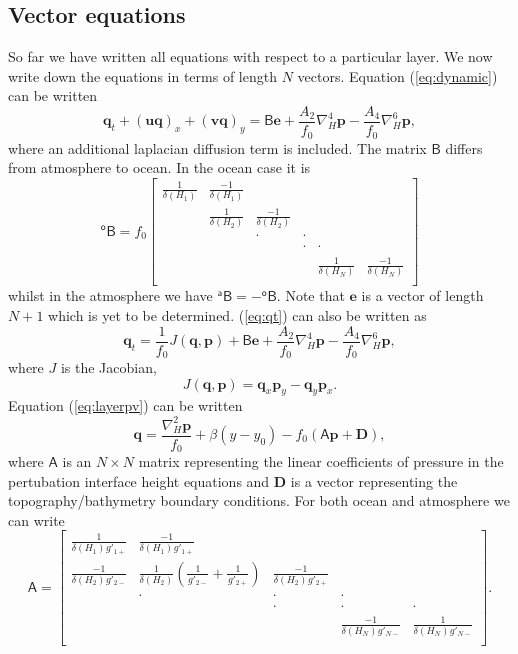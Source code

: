 \documentclass[11pt, a4paper,twoside]{article}
\newcommand{\gp}[2]{{}^{#1}g'_{#2}}
\newcommand{\at}[1]{{{}^{#1}A_2}}
\newcommand{\ah}[1]{{{}^{#1}A_4}}
\newcommand{\vc}[1]{\mathbf{#1}}
\newcommand{\mtx}[1]{\vc{\mathsf{#1}}}
\numberwithin{equation}{section}
\begin{document}
\subsection{Vector equations}

So far we have written all equations with respect to a particular layer. We now write down the equations in terms of length $N$ vectors. Equation (\ref{eq:dynamic}) can be written
\begin{equation}\label{eq:qt}
\vc{q}_t  + \left(\vc{u}\vc{q}\right)_x  + \left(\vc{v}\vc{q}\right)_y  = \mtx{B}\vc{e} + \frac{A_2}{f_0}\nabla_H^4\vc{p} - \frac{A_4}{f_0}\nabla_H^6\vc{p},
\end{equation}
where an additional laplacian diffusion term is included. The matrix $\mtx{B}$ differs from atmosphere to ocean. In the ocean case it is
\begin{equation}
\mtx{{}^oB} = f_0
\left[ \begin{array}{cccccc}
\frac{1}{\delta(H_1)} & \frac{-1}{\delta(H_1)} & &\\
 & \frac{1}{\delta(H_2)} & \frac{-1}{\delta(H_2)} &\\
 & &  \cdot & \cdot \\
 & &  & \cdot & \cdot \\
 & &   & & \frac{1}{\delta(H_N)}& \frac{-1}{\delta(H_N)} \\
 \end{array}\right]
\end{equation}
whilst in the atmosphere we have $\mtx{{}^aB} = - \mtx{{}^oB} $.
Note that $\vc{e}$ is a vector of length $N+1$ which is yet to be determined.
(\ref{eq:qt}) can also be written as
\begin{equation}\label{eq:qt2}
\vc{q}_t  = \frac{1}{f_0} J(\vc{q},\vc{p}) + \mtx{B}\vc{e}  + \frac{\at{}}{f_0}\nabla_H^4 \vc{p} - \frac{\ah{}}{f_0}\nabla_H^6 \vc{p},
\end{equation}
where $J$ is the Jacobian,
\[J(\vc{q},\vc{p}) =\vc{q}_x\vc{p}_y - \vc{q}_y\vc{p}_x.\]
Equation (\ref{eq:layerpv}) can be written
\begin{equation}\label{eq:layerpv2}
\vc{q} = \frac{\nabla_H^2 \vc{p}}{f_0} + \beta(y - y_0) - f_0\left(\mtx{A}\vc{p} + \vc{D}\right),
\end{equation}
where $\mtx{A}$ is an $N\times N$ matrix representing the linear coefficients of pressure in the pertubation interface height equations and $\vc{D}$ is a vector representing the topography/bathymetry boundary conditions.
For both ocean and atmosphere we can write
\begin{equation}\label{eq:mata}
\mtx{A} =
\left[ \begin{array}{cccccc}
    \frac{1}{\delta(H_1) \gp{}{1+}} & \frac{-1}{\delta(H_1) \gp{}{1+}} &&\\
\frac{-1}{\delta(H_2) \gp{}{2-}}  & \frac{1}{\delta(H_2)}\left(\frac{1}{\gp{}{2-}} + \frac{1}{\gp{}{2+}}\right) & \frac{-1}{\delta(H_2) \gp{}{2+}} &\\
&  \cdot & \cdot& \cdot\\
 &&  \cdot & \cdot& \cdot\\
&  & &   \frac{-1}{\delta(H_N) \gp{}{N-}}& \frac{1}{\delta(H_N) \gp{}{N-}} \\
 \end{array}\right].
\end{equation}
\end{document}
